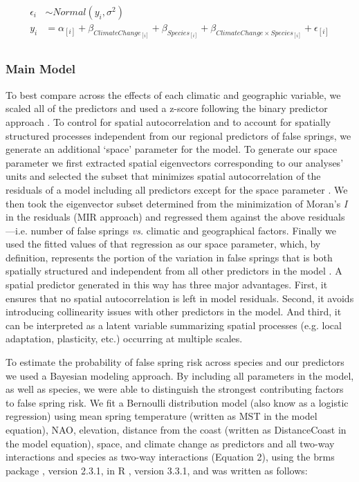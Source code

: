 \documentclass{article}\usepackage[]{graphicx}\usepackage[]{color}
\begin{document}
\begin{align*}
\epsilon_i & \sim Normal(y_i ,  \sigma^{2}) \tag{1}\\
y_i &= \alpha_{[i]} + \beta_{ClimateChange_{[i]}} + \beta_{Species_{[i]}} + \beta_{ClimateChange \times Species_{[i]}} + \epsilon_{[i]} \nonumber\\
\end{align*}

\subsubsection*{Main Model}
To best compare across the effects of each climatic and geographic variable, we scaled all of the predictors and used a z-score following the binary predictor approach \citep{Gelman2006}. To control for spatial autocorrelation and to account for spatially structured processes independent from our regional predictors of false springs, we generate an additional `space' parameter for the model. To generate our space parameter we first extracted spatial eigenvectors corresponding to our analyses' units and selected the subset that minimizes spatial autocorrelation of the residuals of a model including all predictors except for the space parameter \citep[][, see supplemental materials `Methods: Spatial parameter' for more details]{diniz2012selection,Baumen2017}. We then took the eigenvector subset determined from the minimization of Moran's \textit{I} in the residuals (MIR approach) and regressed them against the above residuals---i.e. number of false springs \emph{vs.} climatic and geographical factors. Finally we used the fitted values of that regression as our space parameter, which, by definition, represents the portion of the variation in false springs that is both spatially structured and independent from all other predictors in the model \citep[e.g. average spring temperature, elevation, etc.][]{griffith2006spatial,morales2012imprint}. A spatial predictor generated in this way has three major advantages. First, it ensures that no spatial autocorrelation is left in model residuals. Second, it avoids introducing collinearity issues with other predictors in the model. And third, it can be interpreted as a latent variable summarizing spatial processes (e.g. local adaptation, plasticity, etc.) occurring at multiple scales.

To estimate the probability of false spring risk across species and our predictors we used a Bayesian modeling approach. By including all parameters in the model, as well as species, we were able to distinguish the strongest contributing factors to false spring risk. We fit a Bernoulli distribution model (also know as a logistic regression) using mean spring temperature (written as MST in the model equation), NAO, elevation, distance from the coast (written as DistanceCoast in the model equation), space, and climate change as predictors and all two-way interactions and species as two-way interactions (Equation 2), using the brms package \citep{brms}, version 2.3.1,  in R \citep{R}, version 3.3.1, and was written as follows:
\end{document}
